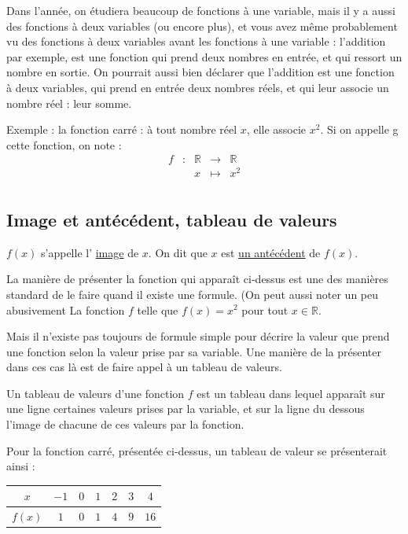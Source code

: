 \documentclass[10pt,a4paper]{book}
\newcommand{\R}{\mathbb{R}}
\begin{document}
Dans l'année, on étudiera beaucoup de fonctions à une variable, mais il y a aussi des fonctions à deux variables (ou encore plus), et vous avez même probablement vu des fonctions à deux variables avant les fonctions à une variable : l'addition par exemple, est une fonction qui prend deux nombres en entrée, et qui ressort un nombre en sortie. On pourrait aussi bien déclarer que l'addition est une fonction à deux variables, qui prend en entrée deux nombres réels, et qui leur associe un nombre réel : leur somme.



Exemple :  la fonction carré : à tout nombre réel $x$, elle associe $x^2$. Si on appelle g cette fonction, on note :
\[
\begin{array}{ccccc}
f & : & \R & \to & \R \\
 & & x & \mapsto & x^2 \\
\end{array}
\]


\subsection{Image et antécédent, tableau de valeurs}

\begin{de}
        $f(x)$ s'appelle l' \underline{image} de $x$. On dit que $x$ est \underline{un antécédent} de $f(x)$.
\end{de}

La manière de présenter la fonction qui apparaît ci-dessus est une des manières standard de le faire quand il existe une formule. (On peut aussi noter un peu abusivement La fonction $f$ telle que $f(x)=x^2$ pour tout $x\in \R$.

Mais il n'existe pas toujours de formule simple pour décrire la valeur que prend une fonction selon la valeur prise par sa variable. Une manière de la présenter dans ces cas là est de faire appel à un tableau de valeurs.

\begin{de}
    Un tableau de valeurs d'une fonction $f$ est un tableau dans lequel apparaît sur une ligne certaines valeurs prises par la variable, et sur la ligne du dessous l'image de chacune de ces valeurs par la fonction.
\end{de}

Pour la fonction carré, présentée ci-dessus, un tableau de valeur se présenterait ainsi :

\begin{center}
    \begin{tabular}{|c|c|c|c|c|c|c|}
    \hline
         $x$ & $-1$ & $0$ & $1$ & $2$&$3$ & $4$ \\
    \hline
         $f(x)$ & $1$ & $0$ &$1$&$4$&$9$&$16$ \\
    \hline
    \end{tabular}
\end{center}
\end{document}
